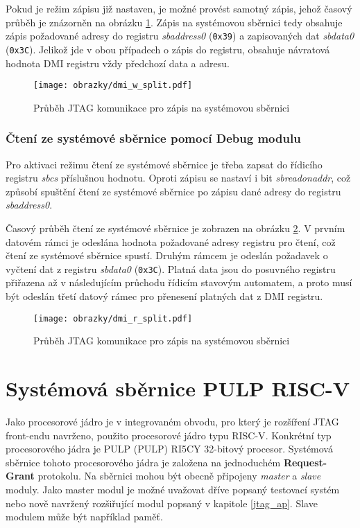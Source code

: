 Pokud je režim zápisu již nastaven, je možné provést samotný zápis, jehož časový průběh je znázorněn na obrázku \ref{fig:dmi_w}. Zápis na systémovou sběrnici tedy obsahuje zápis požadované adresy do registru \textit{sbaddress0} (\texttt{0x39}) a zapisovaných dat \textit{sbdata0} (\texttt{0x3C}). Jelikož jde v obou případech o zápis do registru, obsahuje návratová hodnota \acs{DMI} registru vždy předchozí data a adresu.
 
\begin{figure}[!h]
  \begin{center}
    \texttt{[image: obrazky/dmi\_w\_split.pdf]}
  \end{center}
  \caption{Průběh \acs{JTAG} komunikace pro zápis na systémovou sběrnici}
	\label{fig:dmi_w}
\end{figure}

\subsubsection{Čtení ze systémové sběrnice pomocí Debug modulu}
Pro aktivaci režimu čtení ze systémové sběrnice je třeba zapsat do řídicího registru \textit{sbcs} příslušnou hodnotu. Oproti zápisu se nastaví i bit \textit{sbreadonaddr}, což způsobí spuštění čtení ze systémové sběrnice po zápisu dané adresy do registru \textit{sbaddress0}.

Časový průběh čtení ze systémové sběrnice je zobrazen na obrázku \ref{fig:dmi_r}. V prvním datovém rámci je odeslána hodnota požadované adresy registru pro čtení, což čtení ze systémové sběrnice spustí. Druhým rámcem je odeslán požadavek o vyčtení dat z registru \textit{sbdata0} (\texttt{0x3C}). Platná data jsou do posuvného registru přiřazena až v následujícím průchodu řídicím stavovým automatem, a proto musí být odeslán třetí datový rámec pro přenesení platných dat z \acs{DMI} registru.

\begin{figure}[!h]
  \begin{center}
    \texttt{[image: obrazky/dmi\_r\_split.pdf]}
  \end{center}
  \caption{Průběh \acs{JTAG} komunikace pro zápis na systémovou sběrnici}
	\label{fig:dmi_r}
\end{figure}

\section{Systémová sběrnice PULP RISC-V}
Jako procesorové jádro je v integrovaném obvodu, pro který je rozšíření JTAG front-endu navrženo, použito procesorové jádro typu \acs{RISC-V}. Konkrétní typ procesorového jádra je \acs{PULP} (\acl{PULP}) RI5CY 32-bitový procesor. Systémová sběrnice tohoto procesorového jádra je založena na jednoduchém \textbf{Request-Grant} protokolu. Na sběrnici mohou být obecně připojeny \textit{master} a \textit{slave} moduly. Jako master modul je možné uvažovat dříve popsaný testovací systém nebo nově navržený rozšiřující modul popsaný v kapitole \ref{jtag_ap}. Slave modulem může být například paměť.

